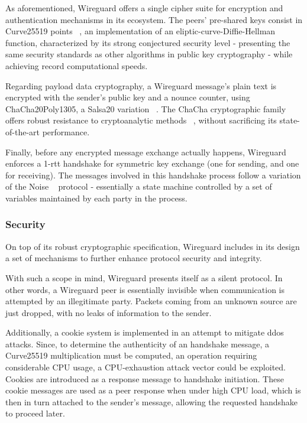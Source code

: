 \documentclass[11pt,twoside,a4paper]{report}
\begin{document}
As aforementioned, Wireguard offers a single cipher suite for encryption and authentication mechanisms in its ecosystem. The peers' pre-shared keys consist in  Curve25519 points ~\cite{bernstein2006curve25519}, an implementation of an eliptic-curve-Diffie-Hellman function, characterized by its strong conjectured security level - presenting the same security standards as other algorithms in public key cryptography - while achieving record computational speeds.

Regarding payload data cryptography, a Wireguard message's plain text is encrypted with the sender's public key and a nounce counter, using ChaCha20Poly1305, a Salsa20 variation ~\cite{bernstein2008chacha}. The ChaCha cryptographic family offers robust resistance to cryptoanalytic methods ~\cite{cryptoeprint:2014/613}, without sacrificing its state-of-the-art performance.

Finally, before any encrypted message exchange actually happens, Wireguard enforces a 1-\acrshort{rtt} handshake for symmetric key exchange (one for sending, and one for receiving). The messages involved in this handshake process follow a variation of the Noise ~\cite{perrin2018noise} protocol - essentially a state machine controlled by a set of variables maintained by each party in the process.

\subsubsection{Security}

On top of its robust cryptographic specification, Wireguard includes in its design a set of mechanisms to further enhance protocol security and integrity.

With such a scope in mind, Wireguard presents itself as a silent protocol. In other words, a Wireguard peer is essentially invisible when communication is attempted by an illegitimate party. Packets coming from an unknown source are just dropped, with no leaks of information to the sender.

Additionally, a cookie system is implemented in an attempt to mitigate \acrshort{ddos} attacks. Since, to determine the authenticity of an handshake message, a Curve25519 multiplication must be computed,  an operation requiring considerable CPU usage, a CPU-exhaustion attack vector could be exploited. Cookies are introduced as a response message to handshake initiation. These cookie messages are used as a peer response when under high CPU load, which is then in turn attached to the sender's message, allowing the requested handshake to proceed later.
\end{document}
